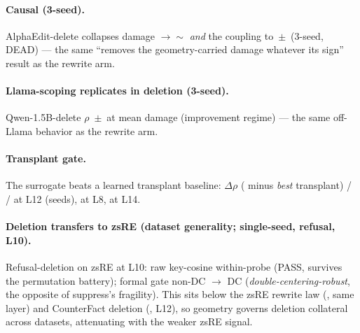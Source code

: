 \paragraph{Causal (3-seed).} AlphaEdit-delete collapses damage
\alphaDelDmgPre{}$\rightarrow\sim$\alphaDelDmgPost{} \emph{and} the coupling to
\alphaDelRho{}\,$\pm$\,\alphaDelRhoSD{} (3-seed, DEAD) --- the same ``removes
the geometry-carried damage whatever its sign'' result as the rewrite arm.

\paragraph{Llama-scoping replicates in deletion (3-seed).} Qwen-1.5B-delete
$\rho$ \qwenDelRho{}\,$\pm$\,\qwenDelRhoSD{} at mean damage \qwenDelDmg{}
(improvement regime) --- the same off-Llama behavior as the rewrite arm.

\paragraph{Transplant gate.} The \SxC{} surrogate beats a learned transplant
baseline: $\Delta\rho$ (\SxC{} minus \emph{best} transplant)
\transDeltaLtwelveA{} / \transDeltaLtwelveB{} / \transDeltaLtwelveC{} at L12
(seeds), \transDeltaLeight{} at L8, \transDeltaLfourteen{} at L14.

\paragraph{Deletion transfers to zsRE (dataset generality; single-seed,
refusal, L10).} Refusal-deletion on zsRE \citep{levy2017zsre} at L10: raw key-cosine within-probe
\zsreDelRaw{} (PASS, survives the permutation battery); formal gate \SxC{}
non-DC \zsreDelNonDC{} $\rightarrow$ DC \zsreDelDC{} (\emph{double-centering-robust},
the opposite of suppress's fragility). This sits below the zsRE rewrite law
(\zsreRewrite{}, same layer) and CounterFact deletion (\delRefNonDCa{}, L12), so
geometry governs deletion collateral across datasets, attenuating with the
weaker zsRE signal.

